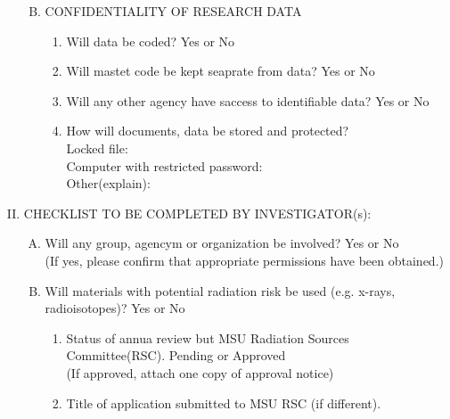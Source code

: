 \documentclass{article}
\begin{document}
\begin{enumerate}[I.]
\begin{enumerate}[A.]
\begin{enumerate}[1.]
        \end{enumerate}
        \item CONFIDENTIALITY OF RESEARCH DATA\\
        
        \begin{enumerate}[1.]
            \item Will data be coded? Yes or No\\
            
            \item Will mastet code be kept seaprate from data? Yes or No\\
            
            \item Will any other agency have saccess to identifiable data? Yes or No\\
            
            \item How will documents, data be stored and protected?\\
            Locked file:\\
            Computer with restricted password:\\
            Other(explain):\\

        \end{enumerate}
    \end{enumerate}
    \item CHECKLIST TO BE COMPLETED BY INVESTIGATOR(s): 
    
    \begin{enumerate}[A.]
        \item Will any group, agencym or organization be involved? Yes or No\\
        (If yes, please confirm that appropriate permissions have been obtained.)

        \item Will materials with potential radiation risk be used (e.g. x-rays, radioisotopes)? Yes or No 
        
        \begin{enumerate}[1.]
            \item Status of annua review but MSU Radiation Sources Committee(RSC). Pending or Approved \\
            (If approved, attach one copy of approval notice)

            \item Title of application submitted to MSU RSC (if different).
            

\end{enumerate}
\end{enumerate}
\end{enumerate}
\end{document}
